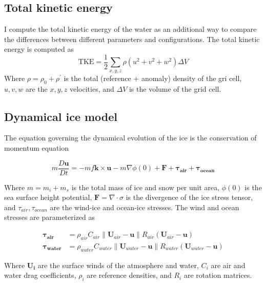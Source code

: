 \documentclass[11pt]{article}
\begin{document}
\subsection{Total kinetic energy}
I compute the total kinetic energy of the water as an additional way to compare the differences between different parameters and configurations. The total kinetic energy is computed as
\begin{equation}
\textrm{TKE} = \frac{1}{2} \sum_{x, y, z} \rho \left ( u^2 + v^2 + w^2\right ) \Delta V
\end{equation}
Where $\rho = \rho_0 + \rho^{\prime}$ is the total (reference + anomaly) density of the gri cell, $u, v, w$ are the $x, y, z$ velocities, and $\Delta V$ is the volume of the grid cell.

\subsection{Dynamical ice model}
The equation governing the dynamical evolution of the ice is the conservation of momentum equation

\begin{equation}
m \frac{D \mathbf{u}}{D t} = -m f \mathbf{k}\times \mathbf{u} - m\nabla \phi(0) + \mathbf{F} + \mathbf{\tau_{air}} + \mathbf{\tau_{ocean}}
\end{equation}

Where  $m = m_i + m_s$ is the total mass of ice and snow per unit area, $\phi(0)$ is the sea surface height potential, $\mathbf{F} = \nabla \cdot \sigma$ is the divergence of the ice stress tensor, and $\tau_{air}, \tau_{ocean}$ are the wind-ice and ocean-ice stresses. The wind and ocean stresses are parameterized as

\begin{equation}
\begin{aligned}
\mathbf{\tau_{air}} &= \rho_{air}C_{air}\left \| \mathbf{U}_{air} - \mathbf{u} \right \| R_{air}\left(\mathbf{U}_{air} - \mathbf{u}\right) \\
\mathbf{\tau_{water}} &= \rho_{water}C_{water}\left \| \mathbf{U}_{water} - \mathbf{u} \right \| R_{water}\left(\mathbf{U}_{water} - \mathbf{u}\right)
\end{aligned}
\end{equation}

Where $\mathbf{U_i}$ are the surface winds of the atmosphere and water, $C_i$ are air and water drag coefficients, $\rho_i$ are reference densities, and $R_i$ are rotation matrices.
\end{document}
